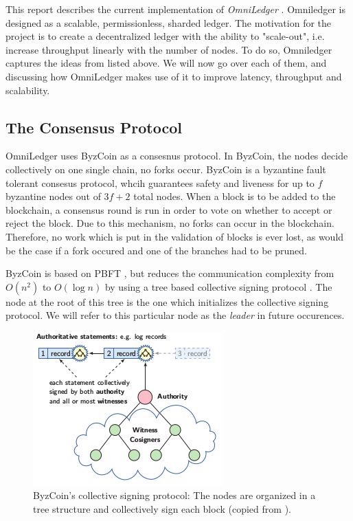 \documentclass[11pt, a4paper, twoside, openright]{article} %
\begin{document}
This report describes the current implementation of \textit{OmniLedger}
\cite{KokorisKogias2017OmniLedgerAS}.
Omniledger is designed as a scalable, permissionless, sharded ledger.
The motivation for the project is to create a
decentralized ledger with the ability to "scale-out", i.e. increase throughput
linearly with the number of nodes.
To do so, Omniledger captures the ideas from \cite{croman2016scaling} listed
above. We will now go over each of them, and discussing how OmniLedger makes
use of it to improve latency, throughput and scalability.

\subsection{The Consensus Protocol}
OmniLedger uses ByzCoin \cite{Kokoris-Kogias:220209} as a consesnus protocol.
In ByzCoin, the nodes decide collectively on one single chain, no forks
occur.
ByzCoin is a byzantine fault tolerant consesus protocol, whcih guarantees
safety and liveness for up to $f$ byzantine nodes out of $3f + 2$ total nodes.
When a block is to be added to the blockchain, a consensus round is run in
order to vote on whether to accept or reject the block.
Due to this mechanism, no forks can occur in the blockchain. Therefore, no work
which is put in the validation of blocks is ever lost, as would be the case if
a fork occured and one of the branches had to be pruned.

ByzCoin is based on PBFT \cite{castro1999practical}, but reduces the
communication complexity from $O(n^2)$ to $O(\log n)$ by using a tree based
collective signing protocol \cite{Syta:221010}.
The node at the root of this tree is the one which initializes the collective
signing protocol. We will refer to this particular node as the \textit{leader}
in future occurences.\\

\begin{figure}[htb!]
    \centering
    \includegraphics{byzcoin.png}
    \caption{ByzCoin's collective signing protocol: The nodes are organized in
    a tree structure and collectively sign each block (copied from
    \cite{Syta:221010}).}
\end{figure}
\end{document}

